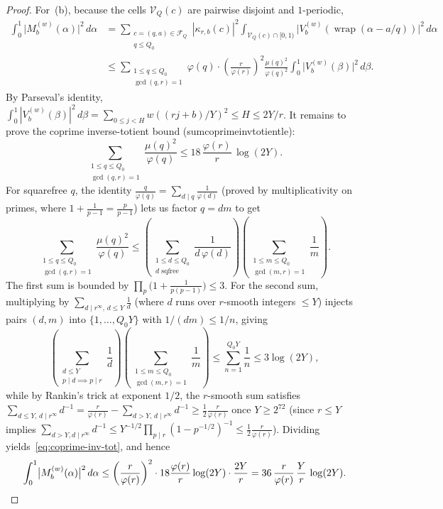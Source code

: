 \documentclass[11pt,reqno]{amsart}
\numberwithin{equation}{section}
\theoremstyle{definition}
\newcommand{\1}{\mathbf{1}}
\newcommand{\V}{\mathcal{V}}
\newcommand{\lean}[1]{{\footnotesize\ttfamily\renewcommand{\_}{\textunderscore\allowbreak}#1}}
\begin{document}
\begin{proof}
For~(b), because the cells $\V_Q(c)$ are pairwise disjoint and $1$-periodic,
\begin{align*}
  \int_0^1 \bigl|M_b^{(w)}(\alpha)\bigr|^2\,d\alpha
  &= \sum_{\substack{c = (q,a) \in \mathcal{F}_Q \\ q \le Q_0}} |\kappa_{r,b}(c)|^2 \int_{\V_Q(c) \cap [0,1)} \bigl|V_b^{(w)}(\operatorname{wrap}(\alpha - a/q))\bigr|^2\,d\alpha \\
  &\le \sum_{\substack{1 \le q \le Q_0 \\ \gcd(q, r) = 1}} \varphi(q) \cdot \left(\frac{r}{\varphi(r)}\right)^2 \frac{\mu(q)^2}{\varphi(q)^2} \int_0^1 \bigl|V_b^{(w)}(\beta)\bigr|^2\,d\beta.
\end{align*}
By Parseval's identity, $\int_0^1 |V_b^{(w)}(\beta)|^2\,d\beta = \sum_{0 \le j < H} w((rj+b)/Y)^2 \le H \le 2Y/r$. It remains to prove the coprime inverse-totient bound (\lean{sum\_coprime\_inv\_totient\_le}):
\begin{equation}\label{eq:coprime-inv-tot}
  \sum_{\substack{1 \le q \le Q_0 \\ \gcd(q, r) = 1}} \frac{\mu(q)^2}{\varphi(q)}
  \le 18\,\frac{\varphi(r)}{r}\,\log(2Y).
\end{equation}
For squarefree $q$, the identity $\frac{q}{\varphi(q)} = \sum_{d \mid q} \frac{1}{\varphi(d)}$ (proved by multiplicativity on primes, where $1 + \frac{1}{p-1} = \frac{p}{p-1}$) lets us factor $q = d m$ to get
\[
  \sum_{\substack{1 \le q \le Q_0 \\ \gcd(q,r)=1}} \frac{\mu(q)^2}{\varphi(q)}
  \le \left(\sum_{\substack{1 \le d \le Q_0 \\ d \text{ sqfree}}} \frac{1}{d\,\varphi(d)}\right)
      \left(\sum_{\substack{1 \le m \le Q_0 \\ \gcd(m,r)=1}} \frac{1}{m}\right).
\]
The first sum is bounded by $\prod_p \bigl(1 + \frac{1}{p(p-1)}\bigr) \le 3$. For the second sum, multiplying by $\sum_{d \mid r^\infty,\, d \le Y} \frac{1}{d}$ (where $d$ runs over $r$-smooth integers $\le Y$) injects pairs $(d, m)$ into $\{1, \dots, Q_0 Y\}$ with $1/(dm) \le 1/n$, giving
\[
  \left(\sum_{\substack{d \le Y \\ p \mid d \implies p \mid r}} \frac{1}{d}\right)
  \left(\sum_{\substack{1 \le m \le Q_0 \\ \gcd(m,r)=1}} \frac{1}{m}\right)
  \le \sum_{n=1}^{Q_0 Y} \frac{1}{n} \le 3\log(2Y),
\]
while by Rankin's trick at exponent $1/2$, the $r$-smooth sum satisfies $\sum_{d \le Y,\, d \mid r^\infty} d^{-1} = \frac{r}{\varphi(r)} - \sum_{d > Y,\, d \mid r^\infty} d^{-1} \ge \frac{1}{2}\frac{r}{\varphi(r)}$ once $Y \ge 2^{72}$ (since $r \le Y$ implies $\sum_{d > Y, d \mid r^\infty} d^{-1} \le Y^{-1/2}\prod_{p \mid r}(1 - p^{-1/2})^{-1} \le \frac{1}{2}\frac{r}{\varphi(r)}$). Dividing yields~\eqref{eq:coprime-inv-tot}, and hence
\[
  \int_0^1 \bigl|M_b^{(w)}(\alpha)\bigr|^2\,d\alpha
  \le \left(\frac{r}{\varphi(r)}\right)^2 \cdot 18\frac{\varphi(r)}{r}\log(2Y) \cdot \frac{2Y}{r}
  = 36\,\frac{r}{\varphi(r)}\,\frac{Y}{r}\,\log(2Y). \qedhere
\]
\end{proof}
\end{document}
